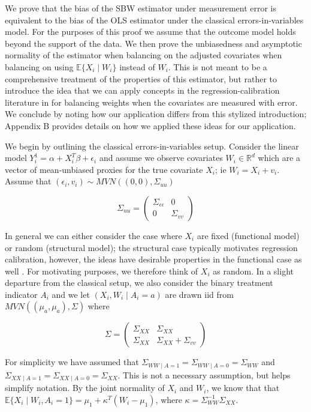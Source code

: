 \documentclass[12pt]{article}
\begin{document}
We prove that the bias of the SBW estimator under measurement error is equivalent to the bias of the OLS estimator under the classical errors-in-variables model. For the purposes of this proof we assume that the outcome model holds beyond the support of the data. We then prove the unbiasedness and asymptotic normality of the estimator when balancing on the adjusted covariates when balancing on using $\mathbb{E}\{X_i \mid W_i\}$ instead of $W_i$. This is not meant to be a comprehensive treatment of the properties of this estimator, but rather to introduce the idea that we can apply concepts in the regression-calibration literature in for balancing weights when the covariates are measured with error. We conclude by noting how our application differs from this stylized introduction; Appendix B provides details on how we applied these ideas for our application.

We begin by outlining the classical errors-in-variables setup. Consider the linear model $Y_i^1 = \alpha + X_i^T\beta + \epsilon_i$ and assume we observe covariates $W_i \in \mathbb{R}^d$ which are a vector of mean-unbiased proxies for the true covariate $X_i$; ie $W_i = X_i + v_i$. Assume that $(\epsilon_i, v_i) \sim MVN((0,0), \Sigma_{uu})$ 

$$
\Sigma_{uu} = \begin{pmatrix} 
\Sigma_{\epsilon\epsilon} & 0 \\ 
0 & \Sigma_{vv} 
\end{pmatrix}
$$ 

In general we can either consider the case where $X_i$ are fixed (functional model) or random (structural model); the structural case typically motivates regression calibration, however, the ideas have desirable properties in the functional case as well \cite{gleser1992importance}. For motivating purposes, we therefore think of $X_i$ as random. In a slight departure from the classical setup, we also consider the binary treatment indicator $A_i$ and we let $(X_i, W_i \mid A_i = a)$ are drawn iid from $MVN((\mu_a, \mu_a), \Sigma)$ where 

$$
\Sigma = \begin{pmatrix} 
\Sigma_{XX} & \Sigma_{XX} \\ 
\Sigma_{XX} & \Sigma_{XX} + \Sigma_{vv} 
\end{pmatrix}
$$ 

For simplicity we have assumed that $\Sigma_{WW \mid A = 1} = \Sigma_{WW \mid A = 0} = \Sigma_{WW}$ and $\Sigma_{XX \mid A = 1} = \Sigma_{XX \mid A = 0} = \Sigma_{XX}$. This is not a necessary assumption, but helps simplify notation. By the joint normality of $X_i$ and $W_i$, we know that that $\mathbb{E}\{X_i \mid W_i, A_i = 1\} = \mu_1 + \kappa^T(W_i - \mu_1)$, where $\kappa = \Sigma_{WW}^{-1}\Sigma_{XX}$.
\end{document}
